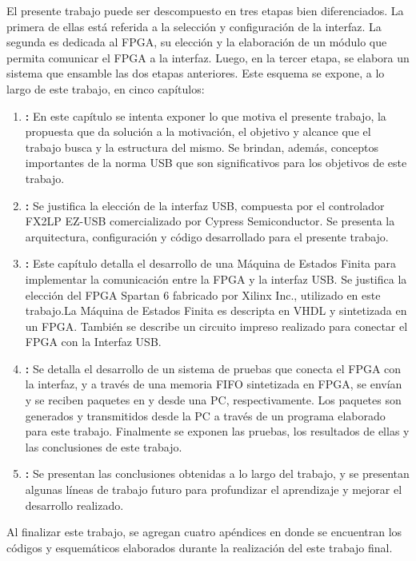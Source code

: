 El presente trabajo puede ser descompuesto en tres etapas bien diferenciados. La primera de ellas está referida a la selección y configuración de la interfaz. La segunda es dedicada al FPGA, su elección y la elaboración de un módulo que permita comunicar el FPGA a la interfaz. Luego, en la tercer etapa, se elabora un sistema que ensamble las dos etapas anteriores.
Este esquema se expone, a lo largo de este trabajo, en cinco capítulos:

\begin{enumerate}
	\item {\textbf{:}} En este capítulo se intenta exponer lo que motiva el presente trabajo, la propuesta que da solución a la motivación, el objetivo y alcance que el trabajo busca y la estructura del mismo. Se brindan, además, conceptos importantes de la norma USB que son significativos para los objetivos de este trabajo.
	\item \textbf{:} Se justifica la elección de la interfaz USB, compuesta por el controlador FX2LP EZ-USB comercializado por Cypress Semiconductor. Se presenta la arquitectura, configuración y código desarrollado para el presente trabajo. 
	\item \textbf{:} Este capítulo detalla el desarrollo de una Máquina de Estados Finita para implementar la comunicación entre la FPGA y la interfaz USB. Se justifica la elección del FPGA Spartan 6 fabricado por Xilinx Inc., utilizado en este trabajo.La Máquina de Estados Finita es descripta en VHDL y sintetizada en un FPGA. También se describe un circuito impreso realizado para conectar el FPGA con la Interfaz USB.
	\item \textbf{:} Se detalla el desarrollo de un sistema de pruebas que conecta el FPGA con la interfaz, y a través de una memoria FIFO sintetizada en FPGA, se envían y se reciben paquetes en y desde una PC, respectivamente. Los paquetes son generados y transmitidos desde la PC a través de un programa elaborado para este trabajo. Finalmente se exponen las pruebas, los resultados de ellas y las conclusiones de este trabajo.
	\item \textbf{:} Se presentan las conclusiones obtenidas a lo  largo del trabajo, y se presentan algunas líneas de trabajo futuro para profundizar el aprendizaje y mejorar el desarrollo realizado.
\end{enumerate}

	Al finalizar este trabajo, se agregan cuatro apéndices en donde se encuentran los códigos y esquemáticos elaborados durante la realización del este trabajo final.